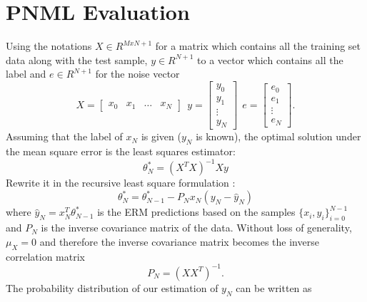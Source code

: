 \documentclass[letterpaper, 10 pt, conference]{ieeeconf}  %
\begin{document}
\section{PNML Evaluation} \label{sec:PNML_eval}
Using the notations $X \in R^{MxN+1}$ for a matrix which contains all the training set data along with the test sample, $y \in R^{N+1}$ to a vector which contains all the label and $e \in R^{N+1}$ for the noise vector
\begin{equation}
X = \begin{bmatrix} x_0 & x_1 & \dots & x_N \end{bmatrix}\ \ 
y = \begin{bmatrix} y_0 \\ y_1 \\ \vdots \\ y_N \end{bmatrix}\ \
e = \begin{bmatrix} e_0 \\ e_1 \\ \vdots \\ e_N  \end{bmatrix}.
\end{equation}
Assuming that the label of $x_N$ is given ($y_N$ is known), the optimal solution under the mean square error is the least squares estimator:
\begin{equation}
\theta ^*_N = (X^T X)^{-1} X y
\end{equation}
Rewrite it in the recursive least square formulation \cite{hayes19969}:
\begin{equation} \label{eq:rls_update}
\theta ^*_N = \theta^*_{N-1} - P_N x_N (y_N - \hat{y}_N)
\end{equation}
where $\hat{y}_N = x_N^T \theta ^*_{N-1}$ is the ERM predictions based on the samples $\{x_i, y_i\}_{i=0}^{N-1}$ and $P_N$ is the inverse covariance matrix of the data.
Without loss of generality, $\mu _{X} = 0$ and therefore the inverse covariance matrix becomes the inverse correlation matrix
\begin{equation}
P_N = (XX^T)^{-1}. 
\end{equation}
The probability distribution of our estimation of $y_N$ can be written as
\end{document}
